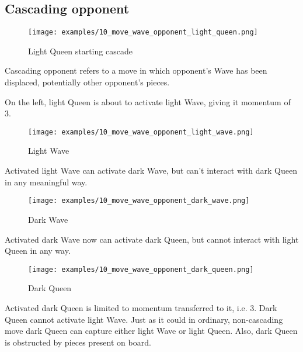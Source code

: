 \clearpage %

\subsection*{Cascading opponent}

\noindent
\begin{wrapfigure}[10]{l}{0.5625\textwidth}
\texttt{[image: examples/10\_move\_wave\_opponent\_light\_queen.png]}
\caption{Light Queen starting cascade}
\label{fig:10_move_wave_opponent_light_queen}
\end{wrapfigure}
Cascading opponent refers to a move in which opponent's Wave has been displaced,
potentially other opponent's pieces.

On the left, light Queen is about to activate light Wave, giving it momentum of 3.

\vspace*{0.155\textheight}
\noindent
\begin{wrapfigure}[5]{r}{0.5625\textwidth}
\texttt{[image: examples/10\_move\_wave\_opponent\_light\_wave.png]}
\caption{Light Wave}
\label{fig:10_move_wave_opponent_light_wave}
\end{wrapfigure}
Activated light Wave can activate dark Wave, but can't interact with dark Queen in
any meaningful way.

\clearpage %

\noindent
\begin{wrapfigure}[5]{l}{0.5625\textwidth}
\texttt{[image: examples/10\_move\_wave\_opponent\_dark\_wave.png]}
\caption{Dark Wave}
\label{fig:10_move_wave_opponent_dark_wave}
\end{wrapfigure}
Activated dark Wave now can activate dark Queen, but cannot interact with light Queen
in any way.

\vspace*{0.315\textheight}
\noindent
\begin{wrapfigure}[13]{r}{0.5625\textwidth}
\texttt{[image: examples/10\_move\_wave\_opponent\_dark\_queen.png]}
\caption{Dark Queen}
\label{fig:10_move_wave_opponent_dark_queen}
\end{wrapfigure}
Activated dark Queen is limited to momentum transferred to it, i.e. 3. Dark Queen
cannot activate light Wave. Just as it could in ordinary, non-cascading move dark
Queen can capture either light Wave or light Queen. Also, dark Queen is obstructed
by pieces present on board.

